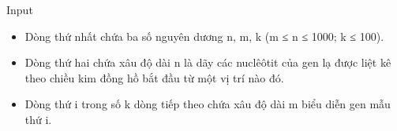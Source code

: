 Input
\begin{itemize}
	\item Dòng thứ nhất chứa ba số nguyên dương n, m, k (m ≤ n ≤ 1000; k ≤ 100).
	\item Dòng thứ hai chứa xâu độ dài n là dãy các nuclêôtit của gen lạ được liệt kê theo chiều kim đồng hồ bắt đầu từ một vị trí nào đó.
	\item Dòng thứ i trong số k dòng tiếp theo chứa xâu độ dài m biểu diễn gen mẫu thứ i.
\end{itemize}